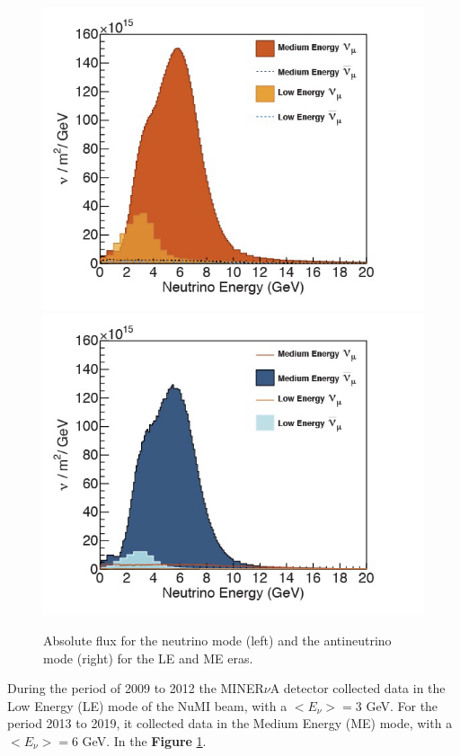 \begin{figure}[!htb]
\centering
\includegraphics[scale=0.38]{Figures/Chapter2/fluxantineutrino.png}\includegraphics[scale=0.38]{Figures/Chapter2/fluxneutrino.png}
        \caption{Absolute flux for the neutrino mode (left) and the antineutrino mode (right) for the LE and ME eras.} 
\label{fig:MnvExp:NuMI:Flux}
\end{figure}

During the period of 2009 to 2012 the MINER$\nu$A detector collected data in the Low Energy (LE) mode of the NuMI beam, with a $<E_\nu> = 3$ GeV. For the period 2013 to 2019, it collected data in the Medium Energy (ME) mode, with a $<E_\nu> = 6$ GeV.  In the \textbf{Figure} \ref{fig:MnvExp:NuMI:Flux}.




